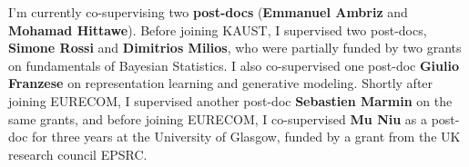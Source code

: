 \documentclass[oneside, a4paper, onecolumn, 10pt]{article}
\begin{document}
I'm currently co-supervising two {\bf post-docs} ({\bf Emmanuel Ambriz} and {\bf Mohamad Hittawe}).
Before joining KAUST, I supervised two post-docs, {\bf Simone Rossi} and {\bf Dimitrios Milios}, who were partially funded by two grants on fundamentals of Bayesian Statistics.
I also co-supervised one post-doc {\bf Giulio Franzese} on representation learning and generative modeling.
Shortly after joining EURECOM, I supervised another post-doc {\bf Sebastien Marmin} on the same grants, and before joining EURECOM, I co-supervised {\bf Mu Niu} as a post-doc for three years at the University of Glasgow, funded by a grant from the UK research council EPSRC. 
\end{document}

